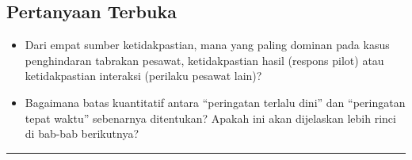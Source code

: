 \documentclass[12pt,a4paper]{article}
\begin{document}
\subsection{Pertanyaan Terbuka}
\begin{itemize}[leftmargin=1.2cm]
    \item Dari empat sumber ketidakpastian, mana yang paling dominan pada kasus penghindaran tabrakan pesawat, ketidakpastian hasil (respons pilot) atau ketidakpastian interaksi (perilaku pesawat lain)?
    \item Bagaimana batas kuantitatif antara ``peringatan terlalu dini'' dan ``peringatan tepat waktu'' sebenarnya ditentukan? Apakah ini akan dijelaskan lebih rinci di bab-bab berikutnya?
\end{itemize}

\vspace{0.5cm}
\hrule
\vspace{0.5cm}
\end{document}
